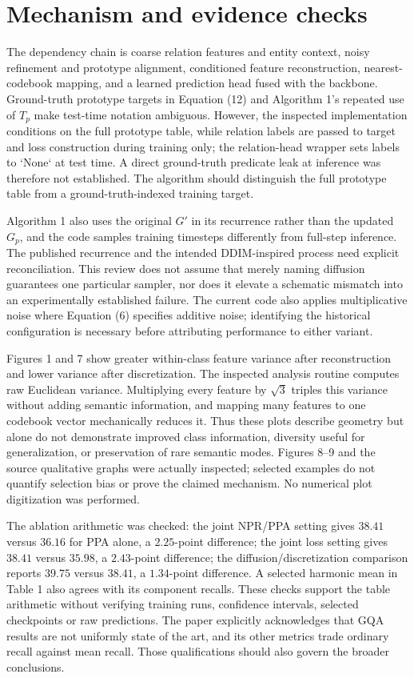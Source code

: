 \documentclass[10pt]{article}
\begin{document}
\section*{Mechanism and evidence checks}
The dependency chain is coarse relation features and entity context, noisy refinement and prototype alignment, conditioned feature reconstruction, nearest-codebook mapping, and a learned prediction head fused with the backbone. Ground-truth prototype targets in Equation (12) and Algorithm 1’s repeated use of \(T_p\) make test-time notation ambiguous. However, the inspected implementation conditions on the full prototype table, while relation labels are passed to target and loss construction during training only; the relation-head wrapper sets labels to `None` at test time. A direct ground-truth predicate leak at inference was therefore not established. The algorithm should distinguish the full prototype table from a ground-truth-indexed training target.\par
Algorithm 1 also uses the original \(G'\) in its recurrence rather than the updated \(G_p\), and the code samples training timesteps differently from full-step inference. The published recurrence and the intended DDIM-inspired process need explicit reconciliation. This review does not assume that merely naming diffusion guarantees one particular sampler, nor does it elevate a schematic mismatch into an experimentally established failure. The current code also applies multiplicative noise where Equation (6) specifies additive noise; identifying the historical configuration is necessary before attributing performance to either variant.\par
Figures 1 and 7 show greater within-class feature variance after reconstruction and lower variance after discretization. The inspected analysis routine computes raw Euclidean variance. Multiplying every feature by \(\sqrt3\) triples this variance without adding semantic information, and mapping many features to one codebook vector mechanically reduces it. Thus these plots describe geometry but alone do not demonstrate improved class information, diversity useful for generalization, or preservation of rare semantic modes. Figures 8–9 and the source qualitative graphs were actually inspected; selected examples do not quantify selection bias or prove the claimed mechanism. No numerical plot digitization was performed.\par
The ablation arithmetic was checked: the joint NPR/PPA setting gives \(38.41\) versus \(36.16\) for PPA alone, a \(2.25\)-point difference; the joint loss setting gives \(38.41\) versus \(35.98\), a \(2.43\)-point difference; the diffusion/discretization comparison reports \(39.75\) versus \(38.41\), a \(1.34\)-point difference. A selected harmonic mean in Table 1 also agrees with its component recalls. These checks support the table arithmetic without verifying training runs, confidence intervals, selected checkpoints or raw predictions. The paper explicitly acknowledges that GQA results are not uniformly state of the art, and its other metrics trade ordinary recall against mean recall. Those qualifications should also govern the broader conclusions.\par
\end{document}
